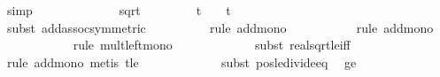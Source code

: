 \begin{isabellebody}
\ simp{\isacharplus}{\kern0pt}\isanewline
\ \ \ \ \ \ \isamarkupfalse%
\ \isamarkupfalse%
\ {\isachardoublequoteopen}{\isachardot}{\kern0pt}{\isachardot}{\kern0pt}{\isachardot}{\kern0pt}\ {\isasymle}\ {}\ {\isacharasterisk}{\kern0pt}\ sqrt\ {\isacharparenleft}{\kern0pt}{}{}\ {\isacharslash}{\kern0pt}\ {\isasymdelta}{\isacharprime}{\kern0pt}\ {\isacharplus}{\kern0pt}\ {}\ {\isacharslash}{\kern0pt}\ {\isasymdelta}{\isacharprime}{\kern0pt}\ {\isacharplus}{\kern0pt}\ {\isacharparenleft}{\kern0pt}t\ {\isacharminus}{\kern0pt}\ {\isasymdelta}{\isacharprime}{\kern0pt}\ {\isacharasterisk}{\kern0pt}\ t{\isacharslash}{\kern0pt}{}{\isacharparenright}{\kern0pt}\ {\isacharplus}{\kern0pt}\ {}\ {\isacharslash}{\kern0pt}\ {\isasymdelta}{\isacharprime}{\kern0pt}{\isachardoublequoteclose}\isanewline
\ \ \ \ \ \ \ \ \isamarkupfalse%
\ {\isacharparenleft}{\kern0pt}subst\ add{\isachardot}{\kern0pt}assoc{\isacharbrackleft}{\kern0pt}symmetric{\isacharbrackright}{\kern0pt}{\isacharparenright}{\kern0pt}\isanewline
\ \ \ \ \ \ \ \ \isamarkupfalse%
\ {\isacharparenleft}{\kern0pt}rule\ add{\isacharunderscore}{\kern0pt}mono{\isacharparenright}{\kern0pt}\isanewline
\ \ \ \ \ \ \ \ \ \isamarkupfalse%
\ {\isacharparenleft}{\kern0pt}rule\ add{\isacharunderscore}{\kern0pt}mono{\isacharparenright}{\kern0pt}\isanewline
\ \ \ \ \ \ \ \ \ \ \isamarkupfalse%
\ {\isacharparenleft}{\kern0pt}rule\ mult{\isacharunderscore}{\kern0pt}left{\isacharunderscore}{\kern0pt}mono{\isacharparenright}{\kern0pt}\isanewline
\ \ \ \ \ \ \ \ \ \ \ \isamarkupfalse%
\ {\isacharparenleft}{\kern0pt}subst\ real{\isacharunderscore}{\kern0pt}sqrt{\isacharunderscore}{\kern0pt}le{\isacharunderscore}{\kern0pt}iff{\isacharparenright}{\kern0pt}\isanewline
\ \ \ \ \ \ \ \ \ \ \ \isamarkupfalse%
\ {\isacharparenleft}{\kern0pt}rule\ add{\isacharunderscore}{\kern0pt}mono{\isacharcomma}{\kern0pt}\ metis\ t{\isacharunderscore}{\kern0pt}le{\isacharunderscore}{\kern0pt}{\isasymdelta}{\isacharprime}{\kern0pt}{\isacharparenright}{\kern0pt}\isanewline
\ \ \ \ \ \ \ \ \ \ \ \isamarkupfalse%
\ {\isacharparenleft}{\kern0pt}subst\ pos{\isacharunderscore}{\kern0pt}le{\isacharunderscore}{\kern0pt}divide{\isacharunderscore}{\kern0pt}eq{\isacharparenright}{\kern0pt}\ \isamarkupfalse%
\ {\isasymdelta}{\isacharprime}{\kern0pt}{\isacharunderscore}{\kern0pt}ge{\isacharunderscore}{\kern0pt}{}\ \isamarkupfalse%

\end{isabellebody}
